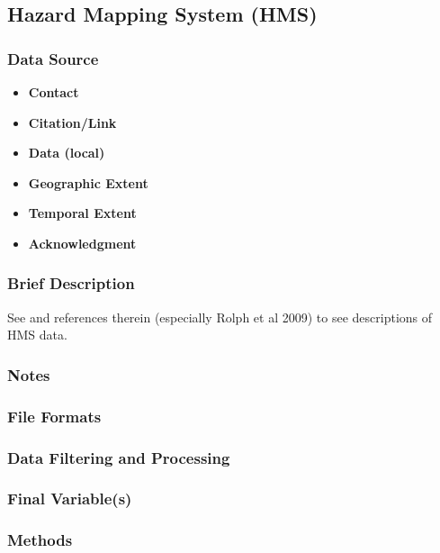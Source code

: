 \subsection{Hazard Mapping System (HMS)}

\subsubsection*{Data Source}

\begin{itemize}[nolistsep]
\item \textbf{Contact} 
\item \textbf{Citation/Link} 
\item \textbf{Data (local)} 
\item \textbf{Geographic Extent} 
\item \textbf{Temporal Extent} 
\item \textbf{Acknowledgment} 
\end{itemize}

\subsubsection*{Brief Description}

See \cite{ODell_contribution_2019} and references therein (especially Rolph et al 2009) to see descriptions of HMS data.

\subsubsection*{Notes}

\subsubsection*{File Formats} 

\subsubsection*{Data Filtering and Processing}

\subsubsection*{Final Variable(s)}

\subsubsection*{Methods}

